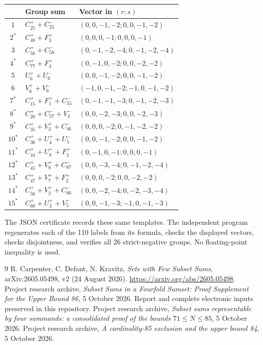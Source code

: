 \documentclass[11pt,a4paper]{article}
\theoremstyle{remark}\newtheorem{remark}[theorem]{Remark}
\begin{document}
\begin{center}\small
\begin{tabular}{cll}
\toprule
 & Group sum & Vector in $(r;s)$\\\midrule
1 & $C^+_{25}+C^-_{25}$ & $(0,0,-1,-2;0,0,-1,-2)$\\
$2^*$ & $C^+_{48}+F^+_3$ & $(0,0,0,-1;0,0,0,-1)$\\
3 & $C^+_{58}+C^-_{58}$ & $(0,-1,-2,-4;0,-1,-2,-4)$\\
$4^*$ & $C^+_{77}+F^+_4$ & $(0,-1,0,-2;0,0,-2,-2)$\\
5 & $U^+_6+U^-_6$ & $(0,0,-1,-2;0,0,-1,-2)$\\
6 & $V^+_6+V^-_6$ & $(-1,0,-1,-2;-1,0,-1,-2)$\\
$7^*$ & $C^+_{15}+F^+_1+C^-_{55}$ & $(0,-1,-1,-3;0,-1,-2,-3)$\\
$8^*$ & $C^+_{26}+C^-_{57}+V^-_4$ & $(0,0,-2,-3;0,0,-2,-3)$\\
$9^*$ & $C^+_{35}+V^+_3+C^-_{46}$ & $(0,0,0,-2;0,-1,-2,-2)$\\
$10^*$ & $C^+_{36}+U^+_4+U^-_5$ & $(0,0,-1,-2;0,0,-1,-2)$\\
$11^*$ & $C^+_{44}+U^+_8+F^+_5$ & $(0,-1,0,-1;0,0,0,-1)$\\
$12^*$ & $C^+_{45}+V^+_8+C^-_{67}$ & $(0,0,-3,-4;0,-1,-2,-4)$\\
$13^*$ & $C^+_{47}+V^+_7+F^+_2$ & $(0,0,0,-2;0,0,-2,-2)$\\
$14^*$ & $C^+_{56}+V^+_2+C^-_{66}$ & $(0,0,-2,-4;0,-2,-3,-4)$\\
$15^*$ & $C^+_{68}+U^+_3+V^-_5$ & $(0,0,-1,-3;-1,0,-1,-3)$\\\bottomrule
\end{tabular}\end{center}
The JSON certificate records these same templates. The independent program regenerates each of the 110 labels from its formula, checks the displayed vectors, checks disjointness, and verifies all 26 strict-negative groups. No floating-point inequality is used.

\begin{thebibliography}{9}
 R. Carpenter, C. Defant, N. Kravitz, \emph{Sets with Few Subset Sums}, arXiv:2605.05498, v2 (24 August 2026). \url{https://arxiv.org/abs/2605.05498}.
 Project research archive, \emph{Subset Sums in a Fourfold Sumset: Proof Supplement for the Upper Bound 86}, 5 October 2026. Report and complete electronic inputs preserved in this repository.
 Project research archive, \emph{Subset sums representable by four summands: a consolidated proof of the bounds $71\le N\le85$}, 5 October 2026.
 Project research archive, \emph{A cardinality-85 exclusion and the upper bound 84}, 5 October 2026.
\end{thebibliography}
\end{document}
